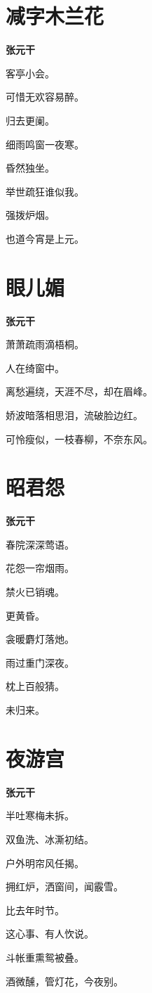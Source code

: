 \documentclass[12pt,a4paper]{ctexbook}
\begin{document}
\section{减字木兰花}
\textbf{张元干}\par\vspace{0.5em}
客亭小会。\par
可惜无欢容易醉。\par
归去更阑。\par
细雨鸣窗一夜寒。\par
昏然独坐。\par
举世疏狂谁似我。\par
强拨炉烟。\par
也道今宵是上元。\par

\section{眼儿媚}
\textbf{张元干}\par\vspace{0.5em}
萧萧疏雨滴梧桐。\par
人在绮窗中。\par
离愁遍绕，天涯不尽，却在眉峰。\par
娇波暗落相思泪，流破脸边红。\par
可怜瘦似，一枝春柳，不奈东风。\par

\section{昭君怨}
\textbf{张元干}\par\vspace{0.5em}
春院深深莺语。\par
花怨一帘烟雨。\par
禁火已销魂。\par
更黄昏。\par
衾暖麝灯落灺。\par
雨过重门深夜。\par
枕上百般猜。\par
未归来。\par

\section{夜游宫}
\textbf{张元干}\par\vspace{0.5em}
半吐寒梅未拆。\par
双鱼洗、冰澌初结。\par
户外明帘风任揭。\par
拥红炉，洒窗间，闻霰雪。\par
比去年时节。\par
这心事、有人忺说。\par
斗帐重熏鸳被叠。\par
酒微醺，管灯花，今夜别。\par
\end{document}
